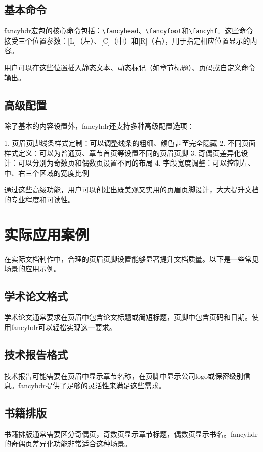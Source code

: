 \documentclass[12pt,a4paper]{report}
\begin{document}
\section{基本命令}
fancyhdr宏包的核心命令包括：\texttt{\textbackslash fancyhead}、\texttt{\textbackslash fancyfoot}和\texttt{\textbackslash fancyhf}。这些命令接受三个位置参数：[L]（左）、[C]（中）和[R]（右），用于指定相应位置显示的内容。

用户可以在这些位置插入静态文本、动态标记（如章节标题）、页码或自定义命令输出。

\section{高级配置}
除了基本的内容设置外，fancyhdr还支持多种高级配置选项：

1. 页眉页脚线条样式定制：可以调整线条的粗细、颜色甚至完全隐藏
2. 不同页面样式定义：可以为普通页、章节首页等设置不同的页眉页脚
3. 奇偶页差异化设计：可以分别为奇数页和偶数页设置不同的布局
4. 字段宽度调整：可以控制左、中、右三个区域的宽度比例

通过这些高级功能，用户可以创建出既美观又实用的页眉页脚设计，大大提升文档的专业程度和可读性。

\chapter{实际应用案例}
在实际文档制作中，合理的页眉页脚设置能够显著提升文档质量。以下是一些常见场景的应用示例。

\section{学术论文格式}
学术论文通常要求在页眉中包含论文标题或简短标题，页脚中包含页码和日期。使用fancyhdr可以轻松实现这一要求。

\section{技术报告格式}
技术报告可能需要在页眉中显示章节名称，在页脚中显示公司logo或保密级别信息。fancyhdr提供了足够的灵活性来满足这些需求。

\section{书籍排版}
书籍排版通常需要区分奇偶页，奇数页显示章节标题，偶数页显示书名。fancyhdr的奇偶页差异化功能非常适合这种场景。
\end{document}
